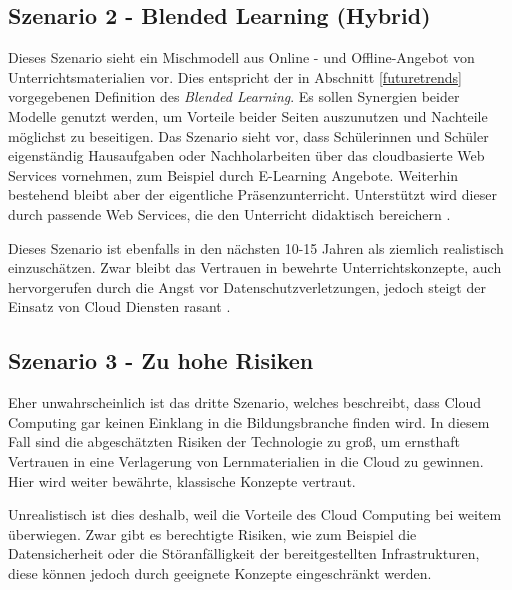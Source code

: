 \subsection{Szenario 2 - Blended Learning (Hybrid)}

Dieses Szenario sieht ein Mischmodell aus Online - und Offline-Angebot von Unterrichtsmaterialien vor. Dies entspricht der in Abschnitt \ref{futuretrends} vorgegebenen Definition des \textit{Blended Learning}. Es sollen Synergien beider Modelle genutzt werden, um Vorteile beider Seiten auszunutzen und Nachteile möglichst zu beseitigen. Das Szenario sieht vor, dass Schülerinnen und Schüler eigenständig Hausaufgaben oder Nachholarbeiten über das cloudbasierte Web Services vornehmen, zum Beispiel durch E-Learning Angebote. Weiterhin bestehend bleibt aber der eigentliche Präsenzunterricht. Unterstützt wird dieser durch passende Web Services, die den Unterricht didaktisch bereichern \cite{meinel}.

Dieses Szenario ist ebenfalls in den nächsten 10-15 Jahren als ziemlich realistisch einzuschätzen. Zwar bleibt das Vertrauen in bewehrte Unterrichtskonzepte, auch hervorgerufen durch die Angst vor Datenschutzverletzungen, jedoch steigt der Einsatz von Cloud Diensten rasant \cite{krcmar}. 

\subsection{Szenario 3 - Zu hohe Risiken}

Eher unwahrscheinlich ist das dritte Szenario, welches beschreibt, dass Cloud Computing gar keinen Einklang in die Bildungsbranche finden wird. In diesem Fall sind die abgeschätzten Risiken der Technologie zu groß, um ernsthaft Vertrauen in eine Verlagerung von Lernmaterialien in die Cloud zu gewinnen. Hier wird weiter bewährte, klassische Konzepte vertraut. 

Unrealistisch ist dies deshalb, weil die Vorteile des Cloud Computing bei weitem überwiegen. Zwar gibt es berechtigte Risiken, wie zum Beispiel die Datensicherheit oder die Störanfälligkeit der bereitgestellten Infrastrukturen, diese können jedoch durch geeignete Konzepte eingeschränkt werden.

